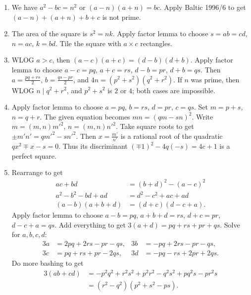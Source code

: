 \documentclass[11pt,paper=letter]{scrartcl}
\begin{document}
\begin{enumerate}

\item We have $a^2 - bc = n^2$ or $(a - n)(a + n) = bc$. Apply Baltic 1996/6 to get $(a - n) + (a + n) + b + c$ is not prime.

\item The area of the square is $s^2 = nk$. Apply factor lemma to choose $s = ab = cd$, $n = ac$, $k = bd$. Tile the square with $a \times c$ rectangles.

\item WLOG $a > c$, then $(a - c)(a + c) = (d - b)(d + b)$. Apply factor lemma to choose $a - c = pq$, $a + c = rs$, $d - b = pr$, $d + b = qs$. Then $a = \frac{pq + rs}{2}$, $b = \frac{qs - pr}{2}$, and $4n = (p^2 + s^2)(q^2 + r^2)$. If $n$ was prime, then WLOG $n \mid q^2 + r^2$, and $p^2 + s^2$ is $2$ or $4$; both cases are impossible.

\item Apply factor lemma to choose $a = pq$, $b = rs$, $d = pr$, $c = qs$. Set $m = p + s$, $n = q + r$. The given equation becomes $mn = (qm - sn)^2$. Write $m = (m, n)m'^2$, $n = (m, n)n'^2$. Take square roots to get $\pm m'n' = qm'^2 - sn'^2$. Then $x = \frac{m'}{n'}$ is a rational root of the quadratic $qx^2 \mp x - s = 0$. Thus its discriminant $ \left( \mp 1 \right)^2 - 4q(-s) = 4c + 1 $ is a perfect square.

\item Rearrange to get \begin{align*}
  ac + bd &= (b + d)^2 - (a - c)^2 \\
  a^2 - b^2 - bd + ad &= d^2 - c^2 + ac + ad \\
  (a - b)(a + b + d) &= (d + c)(d - c + a).
\end{align*}
Apply factor lemma to choose $a - b = pq$, $a + b + d = rs$, $d + c = pr$, $d - c + a = qs$. Add everything to get $3(a + d) = pq + rs + pr + qs$. Solve for $a, b, c, d$: \begin{align*}
  3a &= 2pq + 2rs - pr - qs, &
  3b &= - pq + 2rs - pr - qs, \\
  3c &= pq + rs + pr - 2qs, &
  3d &= - pq - rs + 2pr + 2qs.
\end{align*}
Do more bashing to get \begin{align*}
  3(ab + cd) &= - p^2q^2 + r^2s^2 + p^2r^2 - q^2s^2 + pq^2s - pr^2s \\
             &= (r^2 - q^2)(p^2 + s^2 - ps).
\end{align*}


\end{enumerate}
\end{document}
